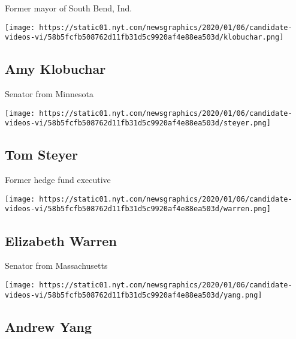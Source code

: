 Former mayor of South Bend, Ind.

\href{https://www.nytimes.com/interactive/2020/us/politics/amy-klobuchar-20-questions.html}{}

\texttt{[image: https://static01.nyt.com/newsgraphics/2020/01/06/candidate-videos-vi/58b5fcfb508762d11fb31d5c9920af4e88ea503d/klobuchar.png]}

\hypertarget{amy-klobuchar}{%
\subsection{Amy Klobuchar}\label{amy-klobuchar}}

Senator from Minnesota

\href{https://www.nytimes.com/interactive/2020/us/politics/tom-steyer-20-questions.html}{}

\texttt{[image: https://static01.nyt.com/newsgraphics/2020/01/06/candidate-videos-vi/58b5fcfb508762d11fb31d5c9920af4e88ea503d/steyer.png]}

\hypertarget{tom-steyer}{%
\subsection{Tom Steyer}\label{tom-steyer}}

Former hedge fund executive

\href{https://www.nytimes.com/interactive/2020/us/politics/elizabeth-warren-20-questions.html}{}

\texttt{[image: https://static01.nyt.com/newsgraphics/2020/01/06/candidate-videos-vi/58b5fcfb508762d11fb31d5c9920af4e88ea503d/warren.png]}

\hypertarget{elizabeth-warren}{%
\subsection{Elizabeth Warren}\label{elizabeth-warren}}

Senator from Massachusetts

\href{https://www.nytimes.com/interactive/2020/us/politics/andrew-yang-20-questions.html}{}

\texttt{[image: https://static01.nyt.com/newsgraphics/2020/01/06/candidate-videos-vi/58b5fcfb508762d11fb31d5c9920af4e88ea503d/yang.png]}

\hypertarget{andrew-yang}{%
\subsection{Andrew Yang}\label{andrew-yang}}

